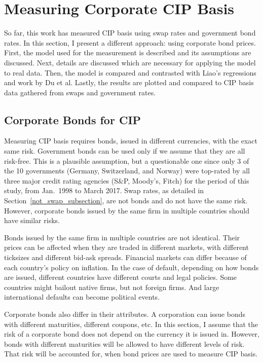 \section{Measuring Corporate CIP Basis} \label{corp_cip_section}

So far, this work has measured CIP basis using swap rates and government bond rates.  In this section, I present a different approach: using corporate bond prices.  First, the model used for the measurement is described and its assumptions are discussed.  Next, details are discussed which are necessary for applying the model to real data.  Then, the model is compared and contrasted with Liao's regressions and work by Du et al.  Lastly, the results are plotted and compared to CIP basis data gathered from swaps and government rates.  

\subsection{Corporate Bonds for CIP}

Measuring CIP basis requires bonds, issued in different currencies, with the exact same risk.  Government bonds can be used only if we assume that they are all risk-free.  This is a plausible assumption, but a questionable one since only 3 of the 10 governments (Germany, Switzerland, and Norway) were top-rated by all three major credit rating agencies (S\&P, Moody's, Fitch) for the period of this study, from Jan.\ 1998 to March 2017.\cite{TradingEconomics}  Swap rates, as detailed in Section~\ref{not_swap_subsection}, are not bonds and do not have the same risk.  However, corporate bonds issued by the same firm in multiple countries should have similar risks.


Bonds issued by the same firm in multiple countries are not identical.  Their prices can be affected when they are traded in different markets, with different ticksizes and different bid-ask spreads.  Financial markets can differ because of each country's policy on inflation.  In the case of default, depending on how bonds are issued, different countries have different courts and legal policies.  Some countries might bailout native firms, but not foreign firms.  And large international defaults can become political events.  

Corporate bonds also differ in their attributes.  A corporation can issue bonds with different maturities, different coupons, etc.  In this section, I assume that the risk of a corporate bond does not depend on the currency it is issued in.  However, bonds with different maturities will be allowed to have different levels of risk.  That risk will be accounted for, when bond prices are used to measure CIP basis.

